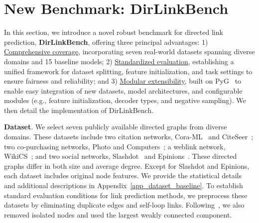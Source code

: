 \section{New Benchmark: DirLinkBench}
In this section, we introduce a novel robust benchmark for directed link prediction, \textbf{DirLinkBench}, offering three principal advantages: 1) \underline{Comprehensive coverage}, incorporating seven real-world datasets spanning diverse domains and 15 baseline models; 2) \underline{Standardized evaluation}, establishing a unified framework for dataset splitting, feature initialization, and task settings to ensure fairness and reliability; and 3) \underline{Modular extensibility}, built on PyG~\cite{pyg} to enable easy integration of new datasets, model architectures, and configurable modules (e.g., feature initialization, decoder types, and negative sampling). We then detail the implementation of DirLinkBench.

\textbf{Dataset}. We select seven publicly available directed graphs from diverse domains. These datasets include two citation networks, Cora-ML~\cite{mccallum2000cora_ml,bojchevski2018cora_ml} and CiteSeer~\cite{sen2008citeseer}; two co-purchasing networks, Photo and Computers~\cite{shchur2018computerandphoto}; a weblink network, WikiCS~\cite{mernyei2020wiki}; and two social networks, Slashdot~\cite{ordozgoiti2020slash} and Epinions~\cite{massa2005epinion}. These directed graphs differ in both size and average degree. %
Except for Slashdot and Epinions, each dataset includes original node features. We provide the statistical details and additional descriptions in Appendix~\ref{app_dataset_baseline}.
To establish standard evaluation conditions for link prediction methods, we preprocess these datasets by eliminating duplicate edges and self-loop links. Following~\cite{appnp,shchur2018computerandphoto}, we also removed isolated nodes and used the largest
weakly connected component. %



